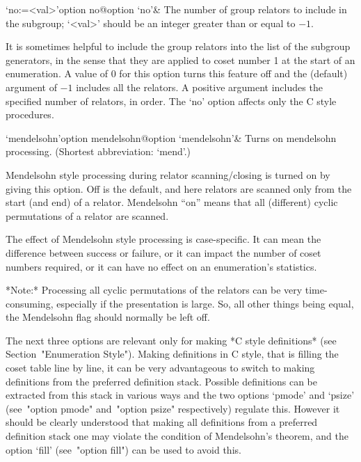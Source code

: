 \>`no:=<val>'{option no}@{option `no'}&
The number of group relators to include in the subgroup;  
`<val>' should be an integer greater than or equal to $-1$.

It is sometimes helpful to include the group relators into the list of
the subgroup generators, in the sense that they are applied  to  coset
number 1 at the start of an enumeration. A value of 0 for this  option
turns this feature off and the (default) argument of $-1$ includes all
the relators. A positive argument includes  the  specified  number  of
relators,  in  order.  The  `no'  option  affects  only  the   C style
procedures.

\>`mendelsohn'{option mendelsohn}@{option `mendelsohn'}&
Turns on mendelsohn processing. (Shortest abbreviation: `mend'.)

Mendelsohn style processing during relator scanning/closing is  turned
on by giving this option. Off is the default, and  here  relators  are
scanned only from the start (and end) of a relator. Mendelsohn  ``on''
means that all  (different)  cyclic  permutations  of  a  relator  are
scanned.

The effect of Mendelsohn style processing  is  case-specific.  It  can
mean the difference between success or failure, or it can  impact  the
number of coset numbers required, or it  can  have  no  effect  on  an
enumeration's statistics.

*Note:* Processing all cyclic permutations of the relators can be very
time-consuming,  especially if  the  presentation is  large.  So,  all
other things being equal, the  Mendelsohn flag should normally be left
off.

\enditems


The  next  three  options  are  relevant  only  for  making  *C  style
definitions* (see Section~"Enumeration Style"). Making definitions  in
C style, that is filling the coset table line by line, it can be  very
advantageous to  switch  to  making  definitions  from  the  preferred
definition stack. Possible definitions  can  be  extracted  from  this
stack in  various  ways  and  the  two  options  `pmode'  and  `psize'
(see~"option pmode" and~"option psize"  respectively)  regulate  this.
However it should be clearly understood that  making  all  definitions
from a preferred definition stack one may  violate  the  condition  of
Mendelsohn's theorem, and the option `fill' (see~"option fill") can be
used to avoid this.

